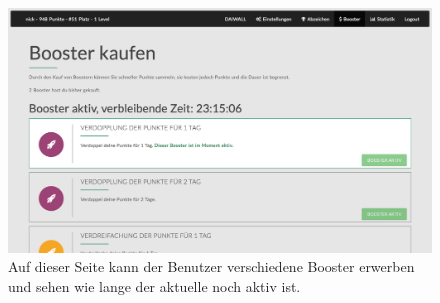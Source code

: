 \documentclass[12pt,twoside]{book}
\begin{document}
\begin{figure}[htbp]
    \centering
    \includegraphics[width=1.0\textwidth]{images/infoboard_booster.png}
    \caption{Auf dieser Seite kann der Benutzer verschiedene Booster erwerben und sehen wie lange der aktuelle noch aktiv ist.}
    \label{fig:booster}
\end{figure}
\end{document}

